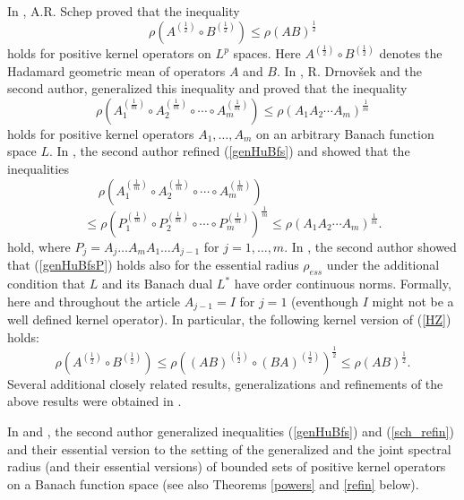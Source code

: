 \documentclass[12pt, reqno]{amsart}
\theoremstyle{definition}
\theoremstyle{remark}
\numberwithin{equation}{section}
\newcommand{\be}{\begin{equation}}
\newcommand{\ee}{\end{equation}}
\begin{document}
In \cite[Theorem 2.8]{S11},  A.R. Schep proved
 that the inequality
\be
\rho \left(A ^{\left( \frac{1}{2} \right)} \circ B  ^{\left( \frac{1}{2} \right)} \right) \le \rho (AB) ^{\frac{1}{2}}
\label{Schep}
\ee
holds for positive kernel operators on $L^p$ spaces. Here $A ^{\left( \frac{1}{2} \right)} \circ B  ^{\left( \frac{1}{2}\right)} $ denotes the Hadamard geometric mean of operators $A$ and $B$. In \cite[Theorem 3.1]{DP16}, R. Drnov\v{s}ek and the second author, generalized this inequality and proved that the inequality
\be
\rho \left(A_1^{\left(\frac{1}{m}\right)} \circ A_2^{\left(\frac{1}{m}\right)} \circ \cdots \circ
A_m^{\left(\frac{1}{m}\right)}\right)   \le \rho (A_1 A_2 \cdots A_m)^{\frac{1}{m}}
\label{genHuBfs}
\ee
holds for positive kernel operators $A_1, \ldots, A_m$ on an arbitrary Banach function space $L$.
 In \cite{P17+}, the second author refined (\ref{genHuBfs}) and showed that the inequalities
$$\rho \left(A_1^{\left(\frac{1}{m}\right)} \circ A_2^{\left(\frac{1}{m}\right)} \circ \cdots \circ
A_m^{\left(\frac{1}{m}\right)}\right) \;\;\;\;\;\;\;\;\;\;\;\;\;\;\;\;\;\;\;\;\;\;\;\;\;\;\;\;\;\;$$
\be
\le \rho  \left(P_1^{\left(\frac{1}{m}\right)} \circ P_2^{\left(\frac{1}{m}\right)} \circ \cdots \circ
P_m^{\left(\frac{1}{m}\right)}\right) ^{\frac{1}{m}}  \le \rho (A_1 A_2 \cdots A_m) ^{\frac{1}{m}} .
\label{genHuBfsP}
\ee
hold, where  $P_j = A_j \ldots A_m A_1 \ldots A_{j-1}$ for $j=1,\ldots , m$. In \cite[Theorem 3.2]{P19} , the second author showed that (\ref{genHuBfsP}) holds also for the essential radius $\rho _{ess}$ under the additional condition that $L$ and its Banach dual $L^*$ have order continuous norms. Formally, here and throughout the article $A_{j-1}=I$ for $j=1$ (eventhough $I$ might not be a well defined kernel operator). In particular, the following kernel version of  (\ref{HZ}) holds:
\be
\rho \left(A^{(\frac{1}{2})} \circ B^{(\frac{1}{2})} \right) \le  \rho \left((AB)^{(\frac{1}{2})} \circ (BA)^{(\frac{1}{2})}\right)^{\frac{1}{2}} \le \rho(AB) ^{\frac{1}{2}}.
\label{sch_refin}
\ee
Several additional closely related results, generalizations and refinements of the above results were obtained in \cite{P19, Zh18, P21, BP21}.

In \cite[Theorem 3.4]{P17} and \cite[Theorem 3.5]{P19}, the second author generalized inequalities (\ref{genHuBfs}) and (\ref{sch_refin}) and their essential version to the setting of the generalized and the joint spectral radius (and their essential versions) of bounded sets of positive kernel operators on a Banach function space (see also Theorems \ref{powers} and  %
\ref{refin} below). %
\end{document}

